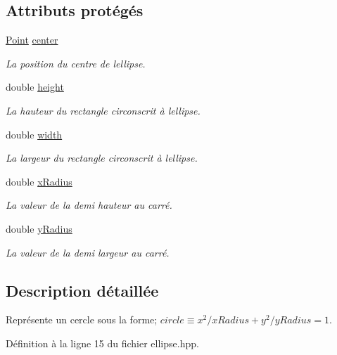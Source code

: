 \subsection*{Attributs protégés}
\begin{DoxyCompactItemize}
\item 
\hyperlink{classPoint}{Point} \hyperlink{classEllipse_a88b27657adf698fded3a36fd97f90190}{center}
\begin{DoxyCompactList}\small\item\em La position du centre de l\textquotesingle{}ellipse. \end{DoxyCompactList}\item 
double \hyperlink{classEllipse_a549345caaff869f7eef31c800e37dd38}{height}
\begin{DoxyCompactList}\small\item\em La hauteur du rectangle circonscrit à l\textquotesingle{}ellipse. \end{DoxyCompactList}\item 
double \hyperlink{classEllipse_a4f2fb4b634a1c37666a0f8419c4f6d39}{width}
\begin{DoxyCompactList}\small\item\em La largeur du rectangle circonscrit à l\textquotesingle{}ellipse. \end{DoxyCompactList}\item 
double \hyperlink{classEllipse_a8e0e2fa0f3200a997f4b0567e588c823}{x\+Radius}
\begin{DoxyCompactList}\small\item\em La valeur de la demi hauteur au carré. \end{DoxyCompactList}\item 
double \hyperlink{classEllipse_a83614d1aaa446b1f8e404b6bc3cc8c19}{y\+Radius}
\begin{DoxyCompactList}\small\item\em La valeur de la demi largeur au carré. \end{DoxyCompactList}\end{DoxyCompactItemize}


\subsection{Description détaillée}
Représente un cercle sous la forme; $ circle \equiv x^2/xRadius + y^2/yRadius = 1 $. 

Définition à la ligne 15 du fichier ellipse.\+hpp.



